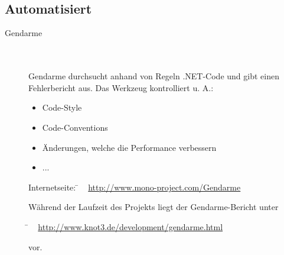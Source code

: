 ~\\\\



\subsection{Automatisiert}
\label{Abschnitt:Programmfehler:Werkzeuge:Automatisiert}



\begin{description}

	\item[Gendarme] \hfill
	\\
	\\
	Gendarme durchsucht anhand von Regeln .NET-Code und gibt einen Fehlerbericht aus. Das Werkzeug kontrolliert u. A.:
	\\
	
	\begin{itemize}
	
		\item Code-Style
		\item Code-Conventions
		\item Änderungen, welche die Performance verbessern
		\item ...
	
	\end{itemize}
			
	\begin{tabbing}
		Internetseite:
		\= ~ \href {http://www.mono-project.com/Gendarme}
                   {http://www.mono-project.com/Gendarme}
		\\
	\end{tabbing}
	
	Während der Laufzeit des Projekts liegt der Gendarme-Bericht unter
	\begin{tabbing}
			\= ~ \href {http://www.knot3.de/development/gendarme.html}
     			       {http://www.knot3.de/development/gendarme.html}
     			   
	\end{tabbing} vor.
	
\end{description}



